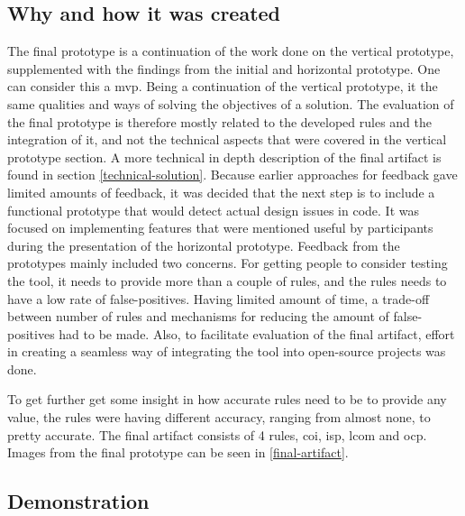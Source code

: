 \documentclass{report}
\begin{document}
\subsection*{Why and how it was created}
The final prototype is a continuation of the work done on the vertical prototype, supplemented with the findings from the initial and horizontal prototype. One can consider this a \gls{mvp}. Being a continuation of the vertical prototype, it the same qualities and ways of solving the objectives of a solution. The evaluation of the final prototype is therefore mostly related to the developed rules and the integration of it, and not the technical aspects that were covered in the vertical prototype section. A more technical in depth description of the final artifact is found in section \ref{technical-solution}. Because earlier approaches for feedback gave limited amounts of feedback, it was decided that the next step is to include a functional prototype that would detect actual design issues in code. It was focused on implementing features that were mentioned useful by participants during the presentation of the horizontal prototype. Feedback from the prototypes mainly included two concerns. For getting people to consider testing the tool, it needs to provide more than a couple of rules, and the rules needs to have a low rate of false-positives. Having limited amount of time, a trade-off between number of rules and mechanisms for reducing the amount of false-positives had to be made. Also, to facilitate evaluation of the final artifact, effort in creating a seamless way of integrating the tool into open-source projects was done. 

To get further get some insight in how accurate rules need to be to provide any value, the rules were having different accuracy, ranging from almost none, to pretty accurate.  The final artifact consists of 4 rules, \gls{coi}, \gls{isp}, \gls{lcom} and \gls{ocp}. Images from the final prototype can be seen in \ref{final-artifact}.

\subsection{Demonstration}
\end{document}
